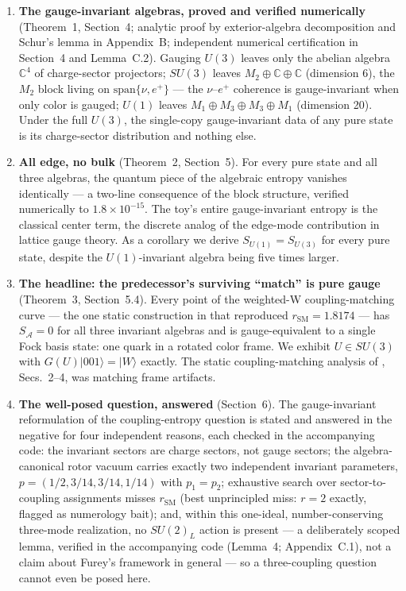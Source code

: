 \documentclass[11pt]{article}
\newcommand{\CC}{\mathbb{C}}
\newcommand{\SA}{S_{\mathcal{A}}}
\newcommand{\rSM}{r_{\mathrm{SM}}}
\begin{document}
\begin{enumerate}

\item \textbf{The gauge-invariant algebras, proved and verified numerically} (Theorem~1, Section~4; analytic proof by exterior-algebra decomposition and Schur's lemma in Appendix~B; independent numerical certification in Section~4 and Lemma~C.2). Gauging $U(3)$ leaves only the abelian algebra $\CC^4$ of charge-sector projectors; $SU(3)$ leaves $M_2 \oplus \CC \oplus \CC$ (dimension 6), the $M_2$ block living on $\mathrm{span}\{\nu, e^+\}$ --- the $\nu$--$e^+$ coherence is gauge-invariant when only color is gauged; $U(1)$ leaves $M_1 \oplus M_3 \oplus M_3 \oplus M_1$ (dimension 20). Under the full $U(3)$, the single-copy gauge-invariant data of any pure state is its charge-sector distribution and nothing else.

\item \textbf{All edge, no bulk} (Theorem~2, Section~5). For every pure state and all three algebras, the quantum piece of the algebraic entropy vanishes identically --- a two-line consequence of the block structure, verified numerically to $1.8 \times 10^{-15}$. The toy's entire gauge-invariant entropy is the classical center term, the discrete analog of the edge-mode contribution in lattice gauge theory. As a corollary we derive $S_{U(1)} = S_{U(3)}$ for every pure state, despite the $U(1)$-invariant algebra being five times larger.

\item \textbf{The headline: the predecessor's surviving ``match'' is pure gauge} (Theorem~3, Section~5.4). Every point of the weighted-W coupling-matching curve --- the one static construction in \cite{companion} that reproduced $\rSM = 1.8174$ --- has $\SA = 0$ for all three invariant algebras and is gauge-equivalent to a single Fock basis state: one quark in a rotated color frame. We exhibit $U \in SU(3)$ with $G(U)|001\rangle = |W\rangle$ exactly. The static coupling-matching analysis of \cite{companion}, Secs.~2--4, was matching frame artifacts.

\item \textbf{The well-posed question, answered} (Section~6). The gauge-invariant reformulation of the coupling-entropy question is stated and answered in the negative for four independent reasons, each checked in the accompanying code: the invariant sectors are charge sectors, not gauge sectors; the algebra-canonical rotor vacuum carries exactly two independent invariant parameters, $p = (1/2, 3/14, 3/14, 1/14)$ with $p_1 = p_2$; exhaustive search over sector-to-coupling assignments misses $\rSM$ (best unprincipled miss: $r = 2$ exactly, flagged as numerology bait); and, within this one-ideal, number-conserving three-mode realization, no $SU(2)_L$ action is present --- a deliberately scoped lemma, verified in the accompanying code (Lemma~4; Appendix~C.1), not a claim about Furey's framework in general --- so a three-coupling question cannot even be posed here.


\end{enumerate}
\end{document}
